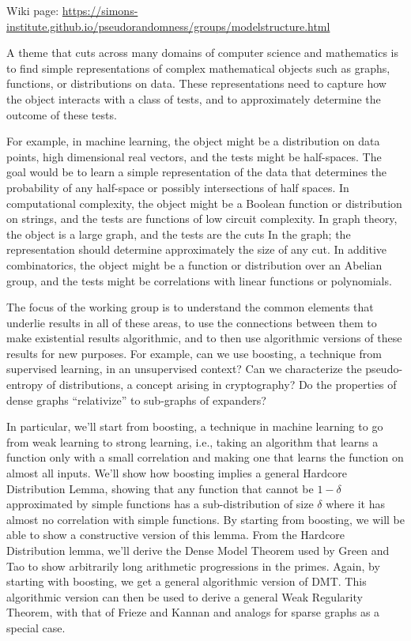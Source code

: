 Wiki page: \url{https://simons-institute.github.io/pseudorandomness/groups/modelstructure.html}


A theme that cuts across many domains of computer science and mathematics is to find simple representations of complex mathematical objects such as graphs, functions, or distributions on data. These representations need to capture how the object interacts with a class of tests, and to approximately determine the outcome of these tests.

For example, in machine learning, the object might be a distribution on data points, high dimensional real vectors, and the tests might be half-spaces. The goal would be to learn a simple representation of the data that determines the probability of any half-space or possibly intersections of half spaces. In computational complexity, the object might be a Boolean function or distribution on strings, and the tests are functions of low circuit complexity. In graph theory, the object is a large graph, and the tests are the cuts In the graph; the representation should determine approximately the size of any cut. In additive combinatorics, the object might be a function or distribution over an Abelian group, and the tests might be correlations with linear functions or polynomials.

The focus of the working group is to understand the common elements that underlie results in all of these areas, to use the connections between them to make existential results algorithmic, and to then use algorithmic versions of these results for new purposes. For example, can we use boosting, a technique from supervised learning, in an unsupervised context? Can we characterize the pseudo-entropy of distributions, a concept arising in cryptography? Do the properties of dense graphs ``relativize'' to sub-graphs of expanders?

In particular, we'll start from boosting, a technique in machine learning to go from weak learning to strong learning, i.e., taking an algorithm that learns a function only with a small correlation and making one that learns the function on almost all inputs. We'll show how boosting implies a general Hardcore Distribution Lemma, showing that any function that cannot be $1-\delta$ approximated by simple functions has a sub-distribution of size $\delta$ where it has almost no correlation with simple functions. By starting from boosting, we will be able to show a constructive version of this lemma. From the Hardcore Distribution lemma, we'll derive the Dense Model Theorem used by Green and Tao to show arbitrarily long arithmetic progressions in the primes. Again, by starting with boosting, we get a general algorithmic version of DMT. This algorithmic version can then be used to derive a general Weak Regularity Theorem, with that of Frieze and Kannan and analogs for sparse graphs as a special case.

